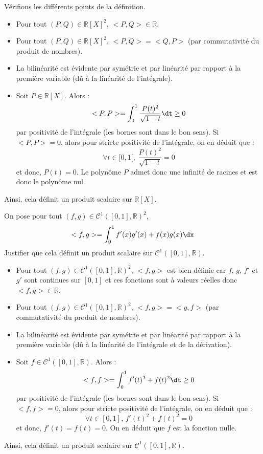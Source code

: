 \documentclass[a4paper,10pt]{report}
\begin{document}
\noindent Vérifions les différents points de la définition.

\begin{itemize}
\item Pour tout $(P,Q) \in \mathbb{R}[X]^2$, $<P,Q> \in \mathbb{R}$.
\item Pour tout $(P,Q) \in \mathbb{R}[X]^2$, $<P,Q>= <Q,P>$ (par commutativité du produit de nombres).
\item La bilinéarité est évidente par symétrie et par linéarité par rapport à la première variable (dû à la linéarité de l'intégrale).
\item Soit $P \in \mathbb{R}[X]$. Alors :
$$ <P,P> =\int_0^1 \dfrac{P(t)^2}{\sqrt{1-t}} \dt \geq 0$$
par positivité de l'intégrale (les bornes sont dans le bon sens). Si $<P,P>=0$, alors pour stricte positivité de l'intégrale, on en déduit que :
$$ \forall t \in [0,1[, \; \dfrac{P(t)^2}{\sqrt{1-t}}=0$$
et donc, $P(t)=0$. Le polynôme $P$ admet donc une infinité de racines et est donc le polynôme nul. 
\end{itemize}
Ainsi, cela définit un produit scalaire sur $\mathbb{R}[X]$.


\begin{Exercice}{} \label{PS2} On pose pour tout $(f,g) \in \mathcal{C}^1([0,1],\mathbb{R})^2$,
$$ <f,g> = \int_{0}^1 f'(x)g'(x)+f(x)g(x) \dx$$
Justifier que cela définit un produit scalaire sur $\mathcal{C}^1([0,1],\mathbb{R})$.
\end{Exercice} 

\corr 

\begin{itemize}
\item Pour tout $(f,g) \in \mathcal{C}^1([0,1],\mathbb{R})^2$, $<f,g>$ est bien définie car $f$, $g$, $f'$ et $g'$ sont continues sur $[0,1]$ et ces fonctions sont à valeurs réelles donc $<f,g> \in \mathbb{R}$.
\item Pour tout $(f,g) \in \mathcal{C}^1([0,1],\mathbb{R})^2$, $<f,g>= <g,f>$ (par commutativité du produit de nombres).
\item La bilinéarité est évidente par symétrie et par linéarité par rapport à la première variable (dû à la linéarité de l'intégrale et de la dérivation).
\item Soit $f \in \mathcal{C}^1([0,1],\mathbb{R})$. Alors :
$$ <f,f> =\int_0^1 f'(t)^2+f(t)^2 \dt \geq 0$$
par positivité de l'intégrale (les bornes sont dans le bon sens). Si $<f,f>=0$, alors pour stricte positivité de l'intégrale, on en déduit que :
$$ \forall t \in [0,1], \, f'(t)^2+f(t)^2=0$$
et donc, $f'(t)=f(t)=0$. On en déduit que $f$ est la fonction nulle. 
\end{itemize}
Ainsi, cela définit un produit scalaire sur $\mathcal{C}^1([0,1],\mathbb{R})$.
\end{document}
